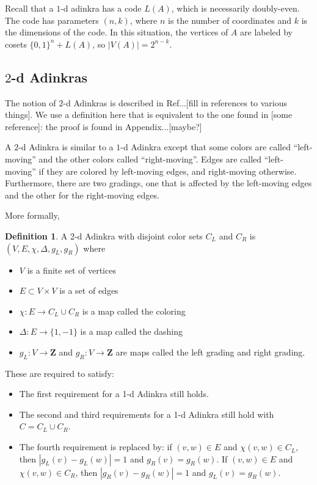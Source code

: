 \documentclass[12pt,twoside,singlespace]{article}
\numberwithin{equation}{section}
\theoremstyle{definition}
\newtheorem{definition}[equation]{Definition}
\newcommand{\ZZ}{\mathbf{Z}}
\begin{document}
Recall that a $1$-d adinkra has a code $L(A)$, which is necessarily doubly-even. The code has parameters $(n,k)$, where $n$ is the number of coordinates and $k$ is the dimensions of the code. In this situation, the vertices of $A$ are labeled by cosets $\{0,1\}^n + L(A)$, so $|V(A)| = 2^{n-k}$.

\subsection{$2$-d Adinkras}
The notion of $2$-d Adinkras is described in Ref...[fill in references to various things].  We use a definition here that is equivalent to the one found in [some reference]: the proof is found in Appendix...[maybe?]

A $2$-d Adinkra is similar to a $1$-d Adinkra except that some colors are called ``left-moving'' and the other colors called ``right-moving''.  Edges are called ``left-moving'' if they are colored by left-moving edges, and right-moving otherwise.  Furthermore, there are two gradings, one that is affected by the left-moving edges and the other for the right-moving edges.

More formally,
\begin{definition}
A 2-d Adinkra with disjoint color sets $C_L$ and $C_R$ is $(V,E,\chi,\Delta,g_L,g_R)$ where
\begin{itemize}
\item $V$ is a finite set of vertices
\item $E\subset V\times V$ is a set of edges
\item $\chi:E\to C_L\cup C_R$ is a map called the coloring
\item $\Delta:E\to \{1,-1\}$ is a map called the dashing
\item $g_L:V\to\ZZ$ and $g_R:V\to\ZZ$ are maps called the left grading and right grading.
\end{itemize}

These are required to satisfy:
\begin{itemize}
\item The first requirement for a 1-d Adinkra still holds.
\item The second and third requirements for a 1-d Adinkra still hold with $C=C_L\cup C_R$.
\item The fourth requirement is replaced by: if $(v,w)\in E$ and $\chi(v,w)\in C_L$, then $|g_L(v)-g_L(w)|=1$ and $g_R(v)=g_R(w)$.  If $(v,w)\in E$ and $\chi(v,w)\in C_R$, then $|g_R(v)-g_R(w)|=1$ and $g_L(v)=g_R(w)$.
\end{itemize}
\end{definition}
\end{document}
